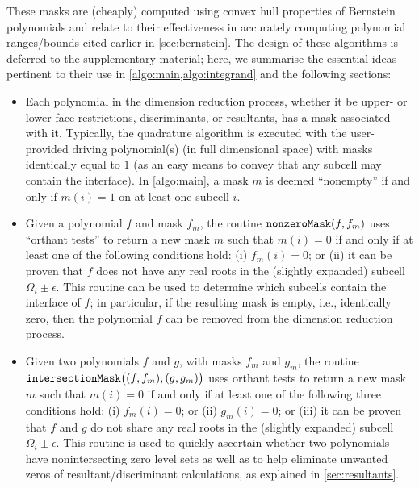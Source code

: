 \documentclass[onefignum,onetabnum,onealgnum,oneeqnum]{siamart190516}
\begin{document}
%

%

%
%

%

These masks are (cheaply) computed using convex hull properties of Bernstein polynomials and relate to their effectiveness in accurately computing polynomial ranges/bounds cited earlier in \cref{sec:bernstein}. The design of these algorithms is deferred to the supplementary material; here, we summarise the essential ideas pertinent to their use in \cref{algo:main,algo:integrand} and the following sections:
\begin{itemize}
\item Each polynomial in the dimension reduction process, whether it be upper- or lower-face restrictions, discriminants, or resultants, has a mask associated with it. Typically, the quadrature algorithm is executed with the user-provided driving polynomial(s) (in full dimensional space) with masks identically equal to $1$ (as an easy means to convey that any subcell may contain the interface). In \cref{algo:main}, a mask $m$ is deemed ``nonempty'' if and only if $m(i) = 1$ on at least one subcell $i$.
\item Given a polynomial $f$ and mask $f_m$, the routine $\verb|nonzeroMask|(f,f_m)$
uses ``orthant tests'' to return a new mask $m$ such that $m(i) = 0$ if and only if at least one of the following conditions hold: (i) $f_m(i) = 0$; or (ii) it can be proven that $f$ does not have any real roots in the (slightly expanded) subcell $\Omega_i \pm \epsilon$. This routine can be used to determine which subcells contain the interface of $f$; in particular, if the resulting mask is empty, i.e., identically zero, then the polynomial $f$ can be removed from the dimension reduction process.
\item Given two polynomials $f$ and $g$, with masks $f_m$ and $g_m$, the routine $\verb|intersectionMask|\bigl((f,f_m),(g,g_m)\bigr)$
uses orthant tests to return a new mask $m$ such that $m(i) = 0$ if and only if at least one of the following three conditions hold: (i) $f_m(i) = 0$; or (ii) $g_m(i) = 0$; or (iii) it can be proven that $f$ and $g$ do not share any real roots in the (slightly expanded) subcell $\Omega_i \pm \epsilon$. This routine is used to quickly ascertain whether two polynomials have nonintersecting zero level sets as well as to help eliminate unwanted zeros of resultant/discriminant calculations, as explained in \cref{sec:resultants}. 


\end{itemize}
\end{document}
